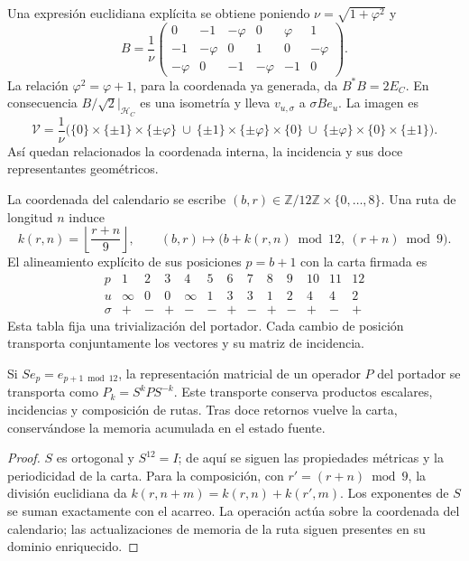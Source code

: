 Una expresión euclidiana explícita se obtiene poniendo
\(\nu=\sqrt{1+\varphi^2}\) y
\[
 B=\frac1\nu
 \begin{pmatrix}
 0&-1&-\varphi&0&\varphi&1\\
 -1&-\varphi&0&1&0&-\varphi\\
 -\varphi&0&-1&-\varphi&-1&0
 \end{pmatrix}.
\]
La relación \(\varphi^2=\varphi+1\), para la coordenada ya generada,
da \(B^*B=2E_C\).
En consecuencia \(B/\sqrt2|_{\mathcal H_C}\) es una isometría y lleva
\(v_{u,\sigma}\) a \(\sigma Be_u\). La imagen es
\[
 \mathcal V=\frac1\nu\bigl(
 \{0\}\times\{\pm1\}\times\{\pm\varphi\}\ \cup\
 \{\pm1\}\times\{\pm\varphi\}\times\{0\}\ \cup\
 \{\pm\varphi\}\times\{0\}\times\{\pm1\}\bigr).
\]
Así quedan relacionados la coordenada interna, la incidencia y sus
doce representantes geométricos.

La coordenada del calendario se escribe \((b,r)\in
\mathbb Z/12\mathbb Z\times\{0,\ldots,8\}\). Una ruta de longitud \(n\)
induce
\[
 k(r,n)=\left\lfloor\frac{r+n}{9}\right\rfloor,\qquad
 (b,r)\longmapsto
 \bigl(b+k(r,n)\bmod12,\ (r+n)\bmod9\bigr).
\]
El alineamiento explícito de sus posiciones \(p=b+1\) con la carta firmada es
\[
\begin{array}{c|rrrrrrrrrrrr}
p&1&2&3&4&5&6&7&8&9&10&11&12\\ \hline
u&\infty&0&0&\infty&1&3&3&1&2&4&4&2\\
\sigma&+&-&+&-&-&+&-&+&-&+&-&+
\end{array}
\]
Esta tabla fija una trivialización del portador. Cada cambio de posición
transporta conjuntamente los vectores y su matriz de incidencia.

\begin{proposition}
Si \(S e_p=e_{p+1\bmod12}\), la representación matricial de un
operador \(P\) del portador se transporta como \(P_k=S^kPS^{-k}\).
Este transporte conserva productos escalares, incidencias y composición
de rutas. Tras doce retornos vuelve la carta, conservándose la memoria
acumulada en el estado fuente.
\end{proposition}
\begin{proof}
\(S\) es ortogonal y \(S^{12}=I\); de aquí se siguen las propiedades
métricas y la periodicidad de la carta. Para la composición, con
\(r'=(r+n)\bmod9\), la división euclidiana da
\(k(r,n+m)=k(r,n)+k(r',m)\). Los exponentes de \(S\) se suman
exactamente con el acarreo. La operación actúa sobre la coordenada
del calendario; las actualizaciones de memoria de la ruta siguen
presentes en su dominio enriquecido.
\end{proof}

